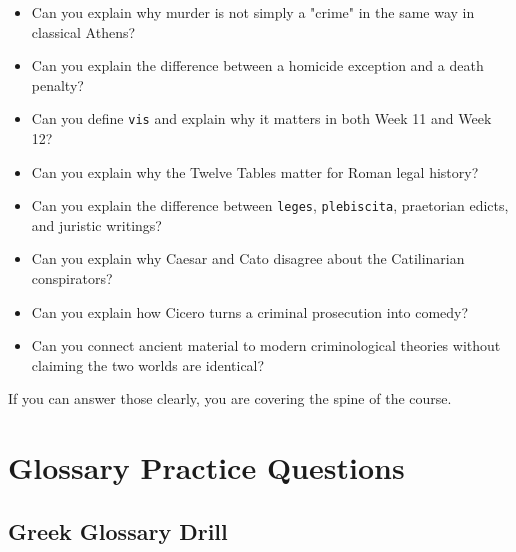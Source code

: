 \documentclass[11pt]{article}
\begin{document}
\begin{itemize}
\item Can you explain why murder is not simply a "crime" in the same way in classical Athens?
\item Can you explain the difference between a homicide exception and a death penalty?
\item Can you define \texttt{vis} and explain why it matters in both Week 11 and Week 12?
\item Can you explain why the Twelve Tables matter for Roman legal history?
\item Can you explain the difference between \texttt{leges}, \texttt{plebiscita}, praetorian edicts, and juristic writings?
\item Can you explain why Caesar and Cato disagree about the Catilinarian conspirators?
\item Can you explain how Cicero turns a criminal prosecution into comedy?
\item Can you connect ancient material to modern criminological theories without claiming the two worlds are identical?
\end{itemize}

If you can answer those clearly, you are covering the spine of the course.

\section{Glossary Practice Questions}

\subsection{Greek Glossary Drill}
\end{document}
